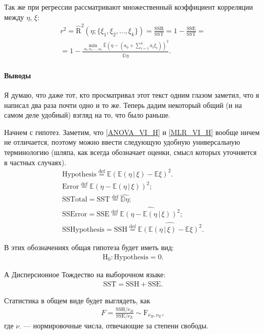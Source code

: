 Так же при регрессии рассматривают множественный коэффициент корреляции между $\eta$, $\xi$:
\begin{gather}
    \label{MLR_coef_cor}
    \nonumber
    r^2 = \hat {\mathrm R}^2(\eta; \{\xi_1, \xi_2, \ldots, \xi_k\}) = \mathrm{\frac{SSR}{SST}} = 1 - \mathrm{\frac{SSE}{SST}} = \\ =
    1 - \frac{\min_{a_0, a_1, \ldots, a_k} \hat {\mathbb E}(\eta - (a_0 + \sum_{i=1}^k a_i \xi_i))^2}{\widehat {\mathbb D} \eta}.
\end{gather}

\paragraph{Выводы}
Я думаю, что даже тот, кто просматривал этот текст одним глазом заметил, что я написал два раза почти одно и то же.
Теперь дадим некоторый общий (и на самом деле удобный) взгляд на то, что было раньше.

Начнем с гипотез. Заметим, что \eqref{ANOVA_VI_H} и \eqref{MLR_VI_H} вообще ничем не отличается, поэтому можно ввести следующую удобную универсальную терминологию (шляпа, как всегда обозначает оценки, смысл которых уточняется в частных случаях).
\begin{gather*}
    \mathrm {Hypothesis} \overset{\mathrm{def}}{=} \mathbb E(\mathbb E(\eta\, | \, \xi) - \mathbb E \xi)^2.\\
    \mathrm {Error} \overset{\mathrm{def}}{=} \mathbb E(\eta - \mathbb E(\eta\, | \, \xi))^2;\\
    \mathrm {SS Total} = \mathrm {SST} \overset{\mathrm{def}}{=} \widehat{\mathbb D \eta};\\
    \mathrm {SS Error} = \mathrm {SSE} \overset{\mathrm{def}}{=} \widehat{\mathbb E(\eta - \mathbb E(\eta\, | \, \xi))^2};\\
    \mathrm {SS Hypothesis} = \mathrm {SSH} \overset{\mathrm{def}}{=} \widehat{\mathbb E(\mathbb E(\eta\, | \, \xi) - \mathbb E \xi)^2}.
\end{gather*}

В этих обозначениях общая гипотеза будет иметь вид:
\begin{gather*}
    \mathrm H_0: \mathrm{Hypothesis} = 0.
\end{gather*}

А Дисперсионное Тождество на выборочном языке:
\begin{gather*}
    \mathrm{SST = SSH + SSE}.
\end{gather*}

Статистика в общем виде будет выглядеть, как
\begin{gather*}
    F = \frac{\mathrm{SSH} / \nu_H}{\mathrm{SSE} / \nu_E} \sim \mathrm F_{\nu_H, \nu_E},
\end{gather*}
где $\nu_\cdot$ --- нормировочные числа, отвечающие за степени свободы.

